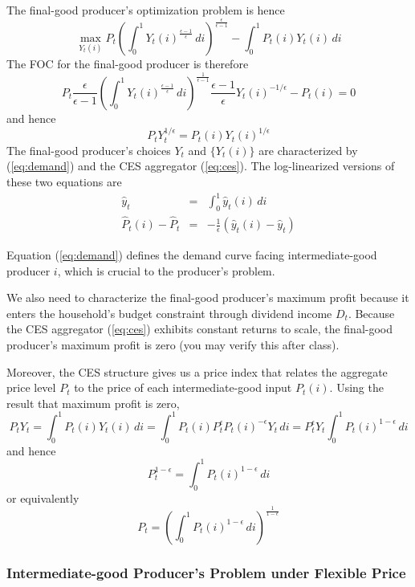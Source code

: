 \documentclass[12pt]{article}
\begin{document}
The final-good producer's optimization problem is hence
\begin{equation}
	\max_{Y_t(i)} P_t  \left(\int_0^1 Y_t(i)^{\frac{\epsilon-1}{\epsilon}}\, di\right)^{\frac{\epsilon}{\epsilon-1}} - \int_0^1 P_{t}(i) Y_{t}(i) \, di
\end{equation}
The FOC for the final-good producer is therefore
\begin{equation*}
	P_t \frac{\epsilon}{\epsilon-1}  \left(\int_0^1 Y_t(i)^{\frac{\epsilon-1}{\epsilon}}\, di\right)^{\frac{1}{\epsilon-1}} \frac{\epsilon-1}{\epsilon} Y_t(i)^{-1/\epsilon} - P_t(i) = 0
\end{equation*}
and hence
\begin{equation} \label{eq:demand}
    P_t Y_t^{1/\epsilon} = P_t(i) Y_t(i)^{1/\epsilon}
\end{equation}
The final-good producer's choices $Y_t$ and $\{Y_t(i)\}$ are characterized by (\ref{eq:demand}) and the CES aggregator (\ref{eq:ces}). The log-linearized versions of these two equations are
\begin{eqnarray}
	\hat{y}_t &=& \int_0^1 \hat{y}_t(i) \, di \\
	\hat{P}_t(i) - \hat{P}_t &=& -\frac{1}{\epsilon} \left(\hat{y}_t(i) - \hat{y}_t\right)
\end{eqnarray}

Equation (\ref{eq:demand}) defines the demand curve facing intermediate-good producer $i$, which is crucial to the producer's problem.

We also need to characterize the final-good producer's maximum profit because it enters the household's budget constraint through dividend income $D_t$. Because the CES aggregator (\ref{eq:ces}) exhibits constant returns to scale, the final-good producer's maximum profit is zero (you may verify this after class). 

Moreover, the CES structure gives us a price index that relates the aggregate price level $P_t$ to the price of each intermediate-good input $P_t(i)$. Using the result that maximum profit is zero,
\begin{equation*}
	P_t Y_t = \int_0^1 P_t(i) Y_t(i) \, di = \int_0^1 P_t(i) P_t^{\epsilon} P_t(i)^{-\epsilon} Y_t \, di = P_t^{\epsilon} Y_t \int_0^1 P_t(i)^{1-\epsilon} \, di
\end{equation*}
and hence
\[P_t^{1-\epsilon} = \int_0^1 P_t(i)^{1-\epsilon} \, di\]
or equivalently
\[P_t = \left( \int_0^1 P_t(i)^{1-\epsilon} \, di\right)^{\frac{1}{1-\epsilon}}\]


\subsubsection{Intermediate-good Producer's Problem under Flexible Price}
\end{document}
